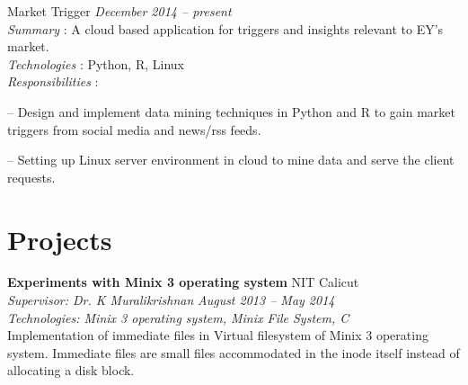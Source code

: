 \documentclass[margin,line]{resume}
\begin{document}
\begin{resume}
    Market Trigger				 \hfill \textit{December 2014 -- present} \\
\textit{Summary} : A cloud based application for triggers and insights relevant to EY's market.	 \\
      \textit{Technologies} : Python, R, Linux\\
      \textit{Responsibilities} : 
     	 	\begin{list2}
\item[--] Design and implement data mining techniques in Python and R to gain market triggers from
social media and news/rss feeds.	
	\item[--] Setting up Linux server environment in cloud to mine data and serve the client requests.
	\end{list2}

	 
 \vspace{3mm}


    \section{\mysidestyle Projects}

   
	
	
    \textbf{Experiments with Minix 3 operating system } 				\hfill NIT Calicut \\
      \textit{Supervisor: Dr. K Muralikrishnan } 			\hfill \textit{August 2013 -- May 2014}\\
      \textit{Technologies: Minix 3 operating system, Minix File System, C }\\
    Implementation of immediate files in Virtual filesystem of Minix 3 operating system. Immediate files are small files accommodated in the inode itself instead of allocating a disk block. 


\end{resume}
\end{document}
